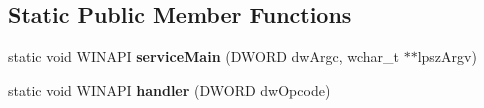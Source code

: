 \subsection*{Static Public Member Functions}
\begin{DoxyCompactItemize}
\item 
\mbox{\label{class_qt_service_sys_private_a0ebf25dd25c87974b313c79b696aec6e}} 
static void W\+I\+N\+A\+PI {\bfseries service\+Main} (D\+W\+O\+RD dw\+Argc, wchar\+\_\+t $\ast$$\ast$lpsz\+Argv)
\item 
\mbox{\label{class_qt_service_sys_private_abec91d93c5a6562dfac877e4074c24d2}} 
static void W\+I\+N\+A\+PI {\bfseries handler} (D\+W\+O\+RD dw\+Opcode)
\end{DoxyCompactItemize}
